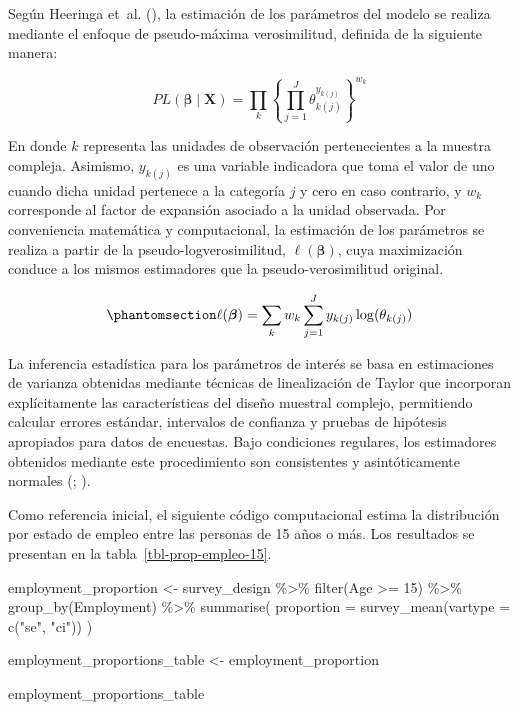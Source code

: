\documentclass[
  spanish,
  11pt,
  letterpaper,
  oneside,
  open=any]{scrbook}
\newenvironment{Shaded}{\begin{snugshade}}{\end{snugshade}}
\newcommand{\AttributeTok}[1]{\textcolor[rgb]{0.40,0.45,0.13}{#1}}
\newcommand{\DecValTok}[1]{\textcolor[rgb]{0.68,0.00,0.00}{#1}}
\newcommand{\FunctionTok}[1]{\textcolor[rgb]{0.28,0.35,0.67}{#1}}
\newcommand{\NormalTok}[1]{\textcolor[rgb]{0.00,0.23,0.31}{#1}}
\newcommand{\OtherTok}[1]{\textcolor[rgb]{0.00,0.23,0.31}{#1}}
\newcommand{\SpecialCharTok}[1]{\textcolor[rgb]{0.37,0.37,0.37}{#1}}
\newcommand{\StringTok}[1]{\textcolor[rgb]{0.13,0.47,0.30}{#1}}
\begin{document}
Según Heeringa et~al. (),
la estimación de los parámetros del modelo se realiza mediante el
enfoque de pseudo-máxima verosimilitud, definida de la siguiente manera:

\[
PL(\boldsymbol{\beta} \mid \mathbf{X}) =
\prod_{k}
\left\{
\prod_{j=1}^{J}
\theta_{k(j)}^{y_{k(j)}}
\right\}^{w_{k}}
\]

En donde \(k\) representa las unidades de observación pertenecientes a
la muestra compleja. Asimismo, \(y_{k(j)}\) es una variable indicadora
que toma el valor de uno cuando dicha unidad pertenece a la categoría
\(j\) y cero en caso contrario, y \(w_{k}\) corresponde al factor de
expansión asociado a la unidad observada. Por conveniencia matemática y
computacional, la estimación de los parámetros se realiza a partir de la
pseudo-logverosimilitud, \(\ell(\boldsymbol{\beta})\), cuya maximización
conduce a los mismos estimadores que la pseudo-verosimilitud original.

\begin{equation}\protect\phantomsection\label{eq-log-pseudoverosimilitud-multinomial}{
\ell(\boldsymbol{\beta})
=
\sum_{k} w_k
\sum_{j=1}^{J}
y_{k(j)}
\log(\theta_{k(j)})
}\end{equation}

La inferencia estadística para los parámetros de interés se basa en
estimaciones de varianza obtenidas mediante técnicas de linealización de
Taylor que incorporan explícitamente las características del diseño
muestral complejo, permitiendo calcular errores estándar, intervalos de
confianza y pruebas de hipótesis apropiados para datos de encuestas.
Bajo condiciones regulares, los estimadores obtenidos mediante este
procedimiento son consistentes y asintóticamente normales
(;
).

Como referencia inicial, el siguiente código computacional estima la
distribución por estado de empleo entre las personas de 15 años o más.
Los resultados se presentan en la tabla~\ref{tbl-prop-empleo-15}.

\begin{Shaded}
\begin{Highlighting}[]
\NormalTok{employment\_proportion }\OtherTok{\textless{}{-}}\NormalTok{ survey\_design }\SpecialCharTok{\%\textgreater{}\%}
  \FunctionTok{filter}\NormalTok{(Age }\SpecialCharTok{\textgreater{}=} \DecValTok{15}\NormalTok{) }\SpecialCharTok{\%\textgreater{}\%}
  \FunctionTok{group\_by}\NormalTok{(Employment) }\SpecialCharTok{\%\textgreater{}\%}
  \FunctionTok{summarise}\NormalTok{(}
    \AttributeTok{proportion =} \FunctionTok{survey\_mean}\NormalTok{(}\AttributeTok{vartype =} \FunctionTok{c}\NormalTok{(}\StringTok{"se"}\NormalTok{, }\StringTok{"ci"}\NormalTok{))}
\NormalTok{  )}

\NormalTok{employment\_proportions\_table }\OtherTok{\textless{}{-}}\NormalTok{ employment\_proportion}

\NormalTok{employment\_proportions\_table}
\end{Highlighting}
\end{Shaded}
\end{document}
